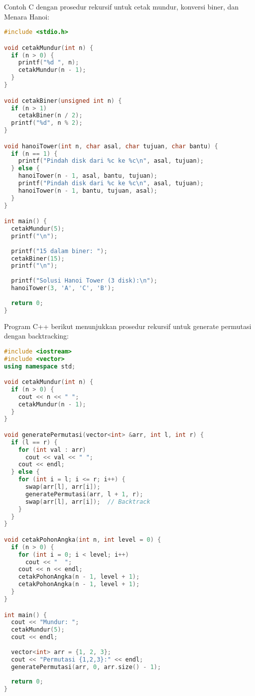 \documentclass[../main.tex]{subfiles}
\begin{document}
Contoh C dengan prosedur rekursif untuk cetak mundur, konversi biner, dan Menara Hanoi:

\begin{lstlisting}[language=C, caption={Prosedur rekursif (C)}]
#include <stdio.h>

void cetakMundur(int n) {
  if (n > 0) {
    printf("%d ", n);
    cetakMundur(n - 1);
  }
}

void cetakBiner(unsigned int n) {
  if (n > 1)
    cetakBiner(n / 2);
  printf("%d", n % 2);
}

void hanoiTower(int n, char asal, char tujuan, char bantu) {
  if (n == 1) {
    printf("Pindah disk dari %c ke %c\n", asal, tujuan);
  } else {
    hanoiTower(n - 1, asal, bantu, tujuan);
    printf("Pindah disk dari %c ke %c\n", asal, tujuan);
    hanoiTower(n - 1, bantu, tujuan, asal);
  }
}

int main() {
  cetakMundur(5);
  printf("\n");
  
  printf("15 dalam biner: ");
  cetakBiner(15);
  printf("\n");
  
  printf("Solusi Hanoi Tower (3 disk):\n");
  hanoiTower(3, 'A', 'C', 'B');
  
  return 0;
}
\end{lstlisting}

Program C++ berikut menunjukkan prosedur rekursif untuk generate permutasi dengan backtracking:

\begin{lstlisting}[language=C++, caption={Prosedur rekursif (C++)}]
#include <iostream>
#include <vector>
using namespace std;

void cetakMundur(int n) {
  if (n > 0) {
    cout << n << " ";
    cetakMundur(n - 1);
  }
}

void generatePermutasi(vector<int> &arr, int l, int r) {
  if (l == r) {
    for (int val : arr)
      cout << val << " ";
    cout << endl;
  } else {
    for (int i = l; i <= r; i++) {
      swap(arr[l], arr[i]);
      generatePermutasi(arr, l + 1, r);
      swap(arr[l], arr[i]);  // Backtrack
    }
  }
}

void cetakPohonAngka(int n, int level = 0) {
  if (n > 0) {
    for (int i = 0; i < level; i++)
      cout << "  ";
    cout << n << endl;
    cetakPohonAngka(n - 1, level + 1);
    cetakPohonAngka(n - 1, level + 1);
  }
}

int main() {
  cout << "Mundur: ";
  cetakMundur(5);
  cout << endl;
  
  vector<int> arr = {1, 2, 3};
  cout << "Permutasi {1,2,3}:" << endl;
  generatePermutasi(arr, 0, arr.size() - 1);
  
  return 0;
}
\end{lstlisting}
\end{document}

